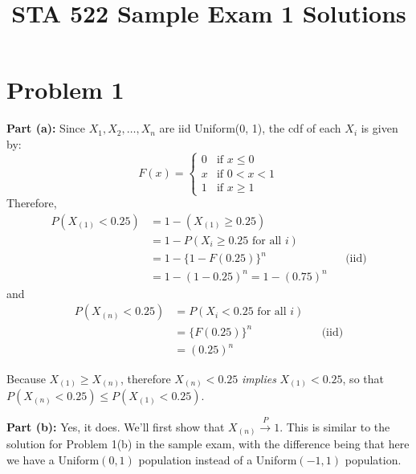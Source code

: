\documentclass[
]{article}
\title{STA 522 Sample Exam 1 Solutions}
\author{}
\date{\vspace{-2.5em}}
\begin{document}
\maketitle

\newcommand{\rs}{X_1,X_2,\dots,X_n}
\newcommand{\on}{\operatorname}
\newcommand{\enter}{\vspace{0.1in}}
\newcommand{\ds}{\displaystyle}
\renewcommand{\bar}{\overline}
\newcommand{\N}{\text{N}}
\renewcommand{\epsilon}{\varepsilon}
\newcommand{\R}{\mathbb{R}}
\newcommand{\Ss}{\mathcal{S}}
\newcommand{\E}{\on{E}}
\newcommand{\var}{\on{Var}}

\renewcommand{\vec}{\underline}
\newcommand{\asim}{\stackrel{a}{\sim}}
\newcommand{\points}[1]{\hfill \textbf{(#1 pts)}}

\hypertarget{problem-1}{%
\section{Problem 1}\label{problem-1}}

\textbf{Part (a):} Since \(X_1,X_2,\dots,X_n\) are iid Uniform(0, 1),
the cdf of each \(X_i\) is given by: \[
F(x) = \begin{cases}
0 & \text{if } x \leq 0 \\
{x} & \text{if } 0 < x < 1 \\
1 & \text{if } x \geq 1
\end{cases}
\] Therefore, \[
\begin{aligned}
P\left(X_{(1)} < 0.25\right) 
&= 1- \left(X_{(1)} \geq 0.25\right) \\ 
&= 1 - P\left(X_i \geq 0.25 \text{ for all } i \right) \\
&= 1 - \{1-F(0.25)\}^n && \text{(iid)} \\
&= 1 - (1 - 0.25)^n = \boxed{1 - (0.75)^n}
\end{aligned}
\] and \[
\begin{aligned}
P\left(X_{(n)} < 0.25\right) 
&= P\left(X_i < 0.25 \text{ for all } i \right) \\
&= \{F(0.25)\}^n && \text{(iid)} \\
&= \boxed{(0.25)^n}
\end{aligned}
\]

Because \(X_{(1)} \geq X_{(n)}\), therefore \(X_{(n)} < 0.25\)
\emph{implies} \(X_{(1)} < 0.25\), so that
\(P(X_{(n)} < 0.25) \leq P(X_{(1)} < 0.25)\).

\textbf{Part (b):} Yes, it does. We'll first show that
\(X_{(n)} \xrightarrow{P} 1\). This is similar to the solution for
Problem 1(b) in the sample exam, with the difference being that here we
have a Uniform\((0, 1)\) population instead of a Uniform\((-1, 1)\)
population.
\end{document}
